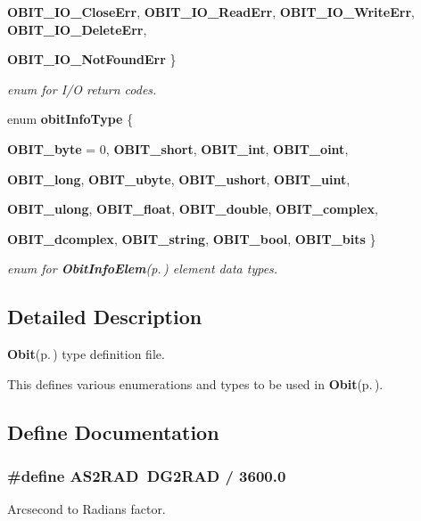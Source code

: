 \begin{CompactItemize}
{\bf OBIT\_\-IO\_\-Close\-Err}, 
{\bf OBIT\_\-IO\_\-Read\-Err}, 
{\bf OBIT\_\-IO\_\-Write\-Err}, 
{\bf OBIT\_\-IO\_\-Delete\-Err}, 
\par
{\bf OBIT\_\-IO\_\-Not\-Found\-Err}
 \}
\begin{CompactList}\small\item\em enum for I/O return codes. \item\end{CompactList}\item 
enum {\bf obit\-Info\-Type} \{ \par
{\bf OBIT\_\-byte} =  0, 
{\bf OBIT\_\-short}, 
{\bf OBIT\_\-int}, 
{\bf OBIT\_\-oint}, 
\par
{\bf OBIT\_\-long}, 
{\bf OBIT\_\-ubyte}, 
{\bf OBIT\_\-ushort}, 
{\bf OBIT\_\-uint}, 
\par
{\bf OBIT\_\-ulong}, 
{\bf OBIT\_\-float}, 
{\bf OBIT\_\-double}, 
{\bf OBIT\_\-complex}, 
\par
{\bf OBIT\_\-dcomplex}, 
{\bf OBIT\_\-string}, 
{\bf OBIT\_\-bool}, 
{\bf OBIT\_\-bits}
 \}
\begin{CompactList}\small\item\em enum for {\bf Obit\-Info\-Elem}{\rm (p.\,\pageref{structObitInfoElem})} element data types. \item\end{CompactList}\end{CompactItemize}


\subsection{Detailed Description}
{\bf Obit}{\rm (p.\,\pageref{structObit})} type definition file. 

This defines various enumerations and types to be used in {\bf Obit}{\rm (p.\,\pageref{structObit})}.

\subsection{Define Documentation}
\subsubsection{\setlength{\rightskip}{0pt plus 5cm}\#define AS2RAD\ DG2RAD / 3600.0}\label{ObitTypes_8h_a3}


Arcsecond to Radians factor. 

